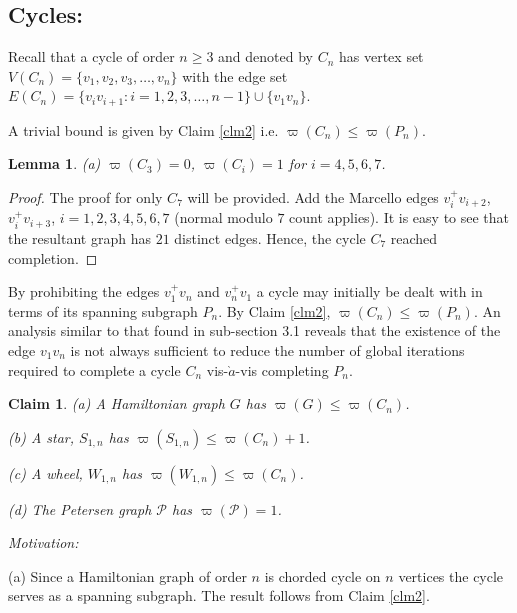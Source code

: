 \documentclass[12pt]{amsart}
\numberwithin{equation}{section}
\newtheorem{lemma}[theorem]{Lemma}
\newtheorem{claim}[theorem]{Claim}
\numberwithin{equation}{section}
\begin{document}
\subsection{Cycles:} Recall that a cycle of order $n \geq 3$ and denoted by $C_n$ has vertex set $V(C_n) = \{v_1, v_2, v_3,\dots, v_n\}$ with the edge set $E(C_n) = \{v_iv_{i+1}:i = 1,2,3,\dots,n-1\} \cup \{v_1v_n\}$.

A trivial bound is given by Claim \ref{clm2} i.e. $\varpi(C_n) \leq \varpi(P_n)$.
\begin{lemma}\label{lem2}
(a) $\varpi(C_3) = 0$, $\varpi(C_i) = 1$ for $i = 4,5,6,7$.
\end{lemma}
\begin{proof}
The proof for only $C_7$ will be provided. Add the Marcello edges $v^+_iv_{i+2}$, $v^+_iv_{i+3}$, $i = 1,2,3,4,5,6,7$ (normal modulo $7$ count applies). It is easy to see that the resultant graph has $21$ distinct edges. Hence, the cycle $C_7$ reached completion. 
\end{proof} 
By prohibiting the edges $v^+_1v_n$ and $v^+_nv_1$ a cycle may initially be dealt with in terms of its spanning subgraph $P_n$. By Claim \ref{clm2}, $\varpi(C_n) \leq \varpi(P_n)$. An analysis similar to that found in sub-section 3.1 reveals that the existence of the edge $v_1v_n$ is not always sufficient to reduce the number of global iterations required to complete a cycle $C_n$ vis-$\grave{a}$-vis completing $P_n$. 
\begin{claim}
(a) A Hamiltonian graph $G$ has $\varpi(G) \leq \varpi(C_n)$.

(b) A star, $S_{1,n}$ has $\varpi(S_{1,n}) \leq \varpi(C_n) + 1$.

(c) A wheel, $W_{1,n}$ has $\varpi(W_{1,n}) \leq \varpi(C_n)$.

(d) The Petersen graph $\mathcal{P}$ has $\varpi(\mathcal{P}) = 1$.
\end{claim}
\textit{Motivation:}

(a) Since a Hamiltonian graph of order $n$ is chorded cycle on $n$ vertices the cycle serves as a spanning subgraph. The result follows from Claim \ref{clm2}.
\end{document}
